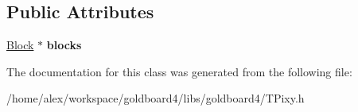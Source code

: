 \subsection*{Public Attributes}
\begin{DoxyCompactItemize}
\item 
\hyperlink{struct_block}{Block} $\ast$ {\bfseries blocks}\hypertarget{class_t_pixy_a3b56576a5135c7209b834b40869eff6a}{}\label{class_t_pixy_a3b56576a5135c7209b834b40869eff6a}

\end{DoxyCompactItemize}


The documentation for this class was generated from the following file\+:\begin{DoxyCompactItemize}
\item 
/home/alex/workspace/goldboard4/libs/goldboard4/T\+Pixy.\+h\end{DoxyCompactItemize}
